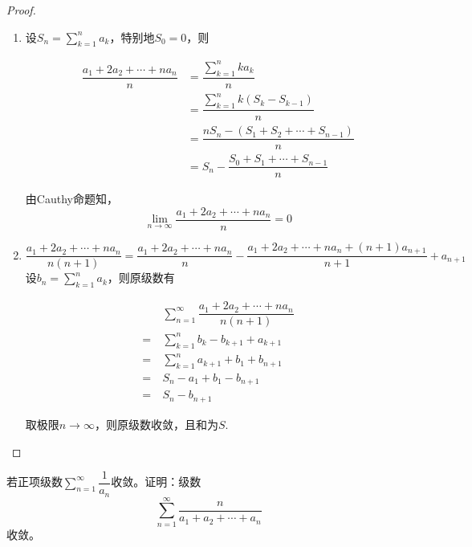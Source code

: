 \begin{proof}
    
    \begin{enumerate}
        
        \item 
            设$S_n = \sum\limits_{k  = 1}^{n}{a_k}$，特别地$S_0 = 0$，则

            \begin{align*}
                \dfrac{a_1 + 2a_2 + \cdots + na_n}{n} & = \dfrac{\sum\limits_{k  = 1}^{n}{ka_k}}{n} \\
                & = \dfrac{\sum\limits_{k  = 1}^{n}{k(S_k - S_{k - 1})}}{n} \\
                & = \dfrac{nS_n - (S_1 + S_2 + \cdots + S_{n - 1})}{n} \\
                & = S_n - \dfrac{S_0 + S_1 + \cdots + S_{n - 1}}{n}
            \end{align*}

            由\textup{Cauthy}命题知，
            \[\lim\limits_{n \to \infty}{\dfrac{a_1 + 2a_2 + \cdots + na_n}{n}} = 0\]

        \item 
            \[\dfrac{a_1 + 2a_2 + \cdots + na_n}{n(n + 1)} = \dfrac{a_1 + 2a_2 + \cdots + na_n}{n} - \dfrac{a_1 + 2a_2 + \cdots + na_n + (n + 1)a_{n + 1}}{n + 1} + a_{n + 1}\]
            设$b_n = \sum\limits_{k  = 1}^{n}{a_k}$，则原级数有

            \begin{align*}
                & \sum\limits_{n = 1}^{\infty}{\dfrac{a_1 + 2a_2 + \cdots + na_n}{n(n + 1)}} \\
                = \  & \sum\limits_{k  = 1}^{n}{b_k - b_{k + 1} + a_{k + 1}} \\
                = \  & \sum\limits_{k  = 1}^{n}{a_{k + 1} + b_1 + b_{n + 1}} \\
                = \  & S_n - a_1 + b_1 - b_{n + 1} \\
                = \  & S_n - b_{n + 1} 
            \end{align*}

            取极限$n \to \infty$，则原级数收敛，且和为$S$.

    \end{enumerate}

\end{proof}

\begin{proposition}
    
    若正项级数$\sum\limits_{n = 1}^{\infty}{\dfrac{1}{a_n}}$收敛。证明：级数
    \[\sum\limits_{n = 1}^{\infty}{\dfrac{n}{a_1 + a_2 + \cdots + a_n}}\]
    收敛。

\end{proposition}

